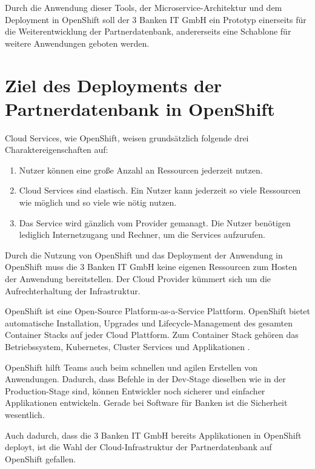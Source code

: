 Durch die Anwendung dieser Tools, der Microservice-Architektur und dem Deployment in OpenShift soll der 3 Banken IT GmbH ein Prototyp einerseits für die Weiterentwicklung der Partnerdatenbank, andererseits eine Schablone für weitere Anwendungen geboten werden.

\section{Ziel des Deployments der Partnerdatenbank in OpenShift}
Cloud Services, wie OpenShift, weisen grundsätzlich folgende drei Charaktereigenschaften auf:
\begin{enumerate}
	\item Nutzer können eine große Anzahl an Ressourcen jederzeit nutzen.
	\item Cloud Services sind elastisch. Ein Nutzer kann jederzeit so viele Ressourcen wie möglich und so viele wie nötig nutzen.
	\item Das Service wird gänzlich vom Provider gemanagt. Die Nutzer benötigen lediglich Internetzugang und Rechner, um die Services aufzurufen. 
\end{enumerate}

Durch die Nutzung von OpenShift und das Deployment der Anwendung in OpenShift muss die 3 Banken IT GmbH keine eigenen Ressourcen zum Hosten der Anwendung bereitstellen. Der Cloud Provider kümmert sich um die Aufrechterhaltung der Infrastruktur.

OpenShift ist eine Open-Source Platform-as-a-Service Plattform. OpenShift bietet automatische Installation, Upgrades und Lifecycle-Management des gesamten Container Stacks auf jeder Cloud Plattform. Zum Container Stack gehören das Betriebssystem, Kubernetes, Cluster Services und Applikationen \cite{OpenShiftOnline}.

OpenShift hilft Teams auch beim schnellen und agilen Erstellen von Anwendungen. Dadurch, dass Befehle in der Dev-Stage dieselben wie in der Production-Stage sind, können Entwickler noch sicherer und einfacher Applikationen entwickeln. Gerade bei Software für Banken ist die Sicherheit wesentlich.

Auch dadurch, dass die 3 Banken IT GmbH bereits Applikationen in OpenShift deployt, ist die Wahl der Cloud-Infrastruktur der Partnerdatenbank auf OpenShift gefallen.

